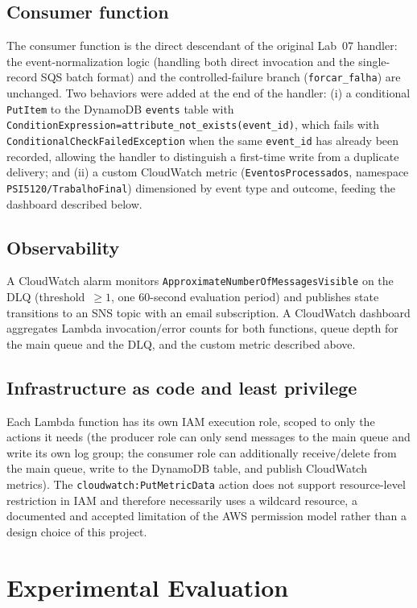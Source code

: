\documentclass[conference]{IEEEtran}
\newcommand{\brk}{\discretionary{}{}{}}
\begin{document}
\subsection{Consumer function}
The consumer function is the direct descendant of the original Lab~07 handler: the event-normalization logic (handling both direct invocation and the single-record SQS batch format) and the controlled-failure branch (\texttt{forcar\_falha}) are unchanged. Two behaviors were added at the end of the handler: (i) a conditional \texttt{PutItem} to the DynamoDB \texttt{events} table with \texttt{Condition\brk Expression=attribute\_not\brk\_exists(event\_id)}, which fails with \texttt{Conditional\brk Check\brk Failed\brk Exception} when the same \texttt{event\_id} has already been recorded, allowing the handler to distinguish a first-time write from a duplicate delivery; and (ii) a custom CloudWatch metric (\texttt{EventosProcessados}, namespace \texttt{PSI5120/TrabalhoFinal}) dimensioned by event type and outcome, feeding the dashboard described below.

\subsection{Observability}
A CloudWatch alarm monitors \texttt{Approximate\brk Number\brk Of\brk Messages\brk Visible} on the DLQ (threshold~$\geq 1$, one 60-second evaluation period) and publishes state transitions to an SNS topic with an email subscription. A CloudWatch dashboard aggregates Lambda invocation/error counts for both functions, queue depth for the main queue and the DLQ, and the custom metric described above.

\subsection{Infrastructure as code and least privilege}
Each Lambda function has its own IAM execution role, scoped to only the actions it needs (the producer role can only send messages to the main queue and write its own log group; the consumer role can additionally receive/delete from the main queue, write to the DynamoDB table, and publish CloudWatch metrics). The \texttt{cloudwatch:PutMetricData} action does not support resource-level restriction in IAM and therefore necessarily uses a wildcard resource, a documented and accepted limitation of the AWS permission model rather than a design choice of this project.

\section{Experimental Evaluation}
\end{document}
